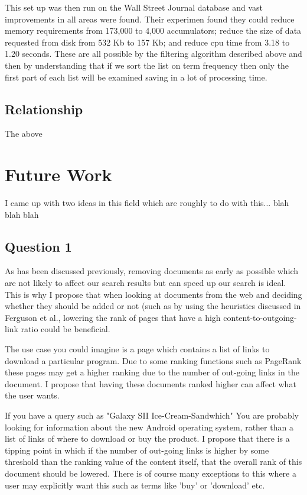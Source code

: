 \documentclass{acm_proc_article-sp}
\begin{document}
This set up was then run on the Wall Street Journal database and vast improvements in all areas were found. Their experimen found they could reduce memory requirements from 173,000 to 4,000 accumulators; reduce the size of data requested from disk from 532 Kb to 157 Kb; and reduce cpu time from 3.18 to 1.20 seconds. These are all possible by the filtering algorithm described above and then by understanding that if we sort the list on term frequency then only the first part of each list will be examined saving in a lot of processing time.

\subsection{Relationship}

The above 

\section{Future Work}
I came up with two ideas in this field which are roughly to do with this... blah blah blah

\subsection{Question 1}

As has been discussed previously, removing documents as early as possible which are not likely to affect our search results but can speed up our search is ideal. This is why I propose that when looking at documents from the web and deciding whether they should be added or not (such as by using the heuristics discussed in Ferguson et al., lowering the rank of pages that have a high content-to-outgoing-link ratio could be beneficial.

The use case you could imagine is a page which contains a list of links to download a particular program. Due to some ranking functions such as PageRank these pages may get a higher ranking due to the number of out-going links in the document. I propose that having these documents ranked higher can affect what the user wants.

If you have a query such as "Galaxy SII Ice-Cream-Sandwhich" You are probably looking for information about the new Android operating system, rather than a list of links of where to download or buy the product. I propose that there is a tipping point in which if the number of out-going links is higher by some threshold than the ranking value of the content itself, that the overall rank of this document should be lowered. There is of course many exceptions to this where a user may explicitly want this such as terms like 'buy' or 'download' etc.
\end{document}
